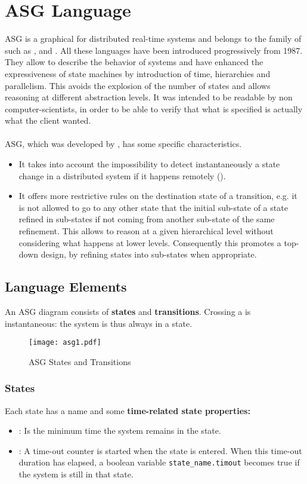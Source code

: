 \documentclass[../main.tex]{subfiles}
\begin{document}
\chapter{ASG Language}
ASG is a graphical  for distributed real-time systems and belongs to the family of  such as ,  and .
All these languages have been introduced progressively from 1987.
They allow to describe the behavior of systems and have enhanced the expressiveness of state machines by introduction of time, hierarchies and parallelism.
This avoids the explosion of the number of states and allows reasoning at different abstraction levels.
It was intended to be readable by non computer-scientists, in order to be able to verify that what is specified is actually what the client wanted.
\\\\
ASG, which was developed by , has some specific characteristics.
\begin{itemize}
	\item It takes into account the impossibility to detect instantaneously a state change in a distributed system if it happens remotely ().
	\item It offers more restrictive rules on the destination state of a transition, e.g. it is not allowed to go to any other state that the initial sub-state of a state refined in sub-states if not coming from another sub-state of the same refinement.
    This allows to reason at a given hierarchical level without considering what happens at lower levels.
    Consequently this promotes a top-down design, by refining states into sub-states when appropriate.
\end{itemize}

\section{Language Elements}
An ASG diagram consists of \textbf{states} and \textbf{transitions}. Crossing a  is instantaneous: the system is thus always in a state.
\begin{figure}[H]
    \centering
    \texttt{[image: asg1.pdf]}
    \caption{ASG States and Transitions}
    \label{asg1}
\end{figure}

\subsection{States}
Each state has a name and some \textbf{time-related state properties:}
\begin{itemize}
	\item {}: Is the minimum time the system remains in the state.
	\item {}: A time-out counter is started when the state is entered. When this time-out duration has elapsed, a boolean variable \texttt{state\_name.timout} becomes true if the system is still in that state.
\end{itemize}
\end{document}
